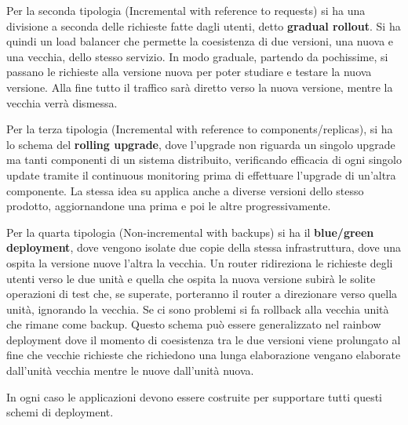 Per la seconda tipologia (Incremental with reference to requests) si ha una divisione a seconda delle richieste fatte dagli utenti, detto \textbf{gradual rollout}. Si ha quindi un load balancer che permette la coesistenza di due versioni, una nuova e una vecchia, dello stesso servizio. In modo graduale, partendo da pochissime, si passano le richieste alla versione nuova per poter studiare e testare la nuova versione. Alla fine tutto il traffico sarà diretto verso la nuova versione, mentre la vecchia verrà dismessa.

Per la terza tipologia (Incremental with reference to components/replicas), si ha lo schema del \textbf{rolling upgrade}, dove l’upgrade non riguarda un singolo upgrade ma tanti componenti di un sistema distribuito, verificando efficacia di ogni singolo update tramite il continuous monitoring prima di effettuare l'upgrade di un'altra componente. La stessa idea su applica anche a diverse versioni dello stesso prodotto, aggiornandone una prima e poi le altre progressivamente.

Per la quarta tipologia (Non-incremental with backups) si ha il \textbf{blue/green deployment}, dove vengono isolate due copie della stessa infrastruttura, dove una ospita la versione nuove l’altra la vecchia. Un router ridireziona le richieste degli utenti verso le due unità e quella che ospita la nuova versione subirà le solite operazioni di test che, se superate, porteranno il router a direzionare verso quella unità, ignorando la vecchia. Se ci sono problemi si fa rollback alla vecchia unità che rimane come backup. Questo schema può essere generalizzato nel rainbow deployment dove il momento di coesistenza tra le due versioni viene prolungato al fine che vecchie richieste che richiedono una lunga elaborazione vengano elaborate dall’unità vecchia mentre le nuove dall’unità nuova.

In ogni caso le applicazioni devono essere costruite per supportare tutti questi schemi di deployment.
